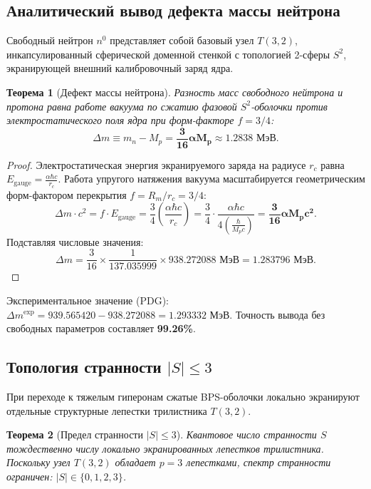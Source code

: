 \documentclass[12pt,a4paper]{article}
\newtheorem{theorem}{Теорема}
\begin{document}
	\subsection{Аналитический вывод дефекта массы нейтрона}
	Свободный нейтрон $n^0$ представляет собой базовый узел $T(3,2)$, инкапсулированный сферической доменной стенкой с топологией 2-сферы $S^2$, экранирующей внешний калибровочный заряд ядра.
	
	\begin{theorem}[Дефект массы нейтрона]
		Разность масс свободного нейтрона и протона равна работе вакуума по сжатию фазовой $S^2$-оболочки против электростатического поля ядра при форм-факторе $f = 3/4$:
		\begin{equation}
			\Delta m \equiv m_n - M_p = \mathbf{\frac{3}{16} \alpha M_p} \approx \mathbf{1.2838 \text{ МэВ}}.
		\end{equation}
	\end{theorem}
	
	\begin{proof}
		Электростатическая энергия экранируемого заряда на радиусе $r_c$ равна $E_{\text{gauge}} = \frac{\alpha \hbar c}{r_c}$. Работа упругого натяжения вакуума масштабируется геометрическим форм-фактором перекрытия $f = R_m / r_c = 3/4$:
		\begin{equation}
			\Delta m \cdot c^2 = f \cdot E_{\text{gauge}} = \frac{3}{4} \left( \frac{\alpha \hbar c}{r_c} \right) = \frac{3}{4} \cdot \frac{\alpha \hbar c}{4 \left( \frac{\hbar}{M_p c} \right)} = \mathbf{\frac{3}{16} \alpha M_p c^2}.
		\end{equation}
		Подставляя числовые значения:
		\begin{equation}
			\Delta m = \frac{3}{16} \times \frac{1}{137.035999} \times 938.272088 \text{ МэВ} = \mathbf{1.283796 \text{ МэВ}}.
		\end{equation}
	\end{proof}
	Экспериментальное значение (PDG): $\Delta m^{\text{exp}} = 939.565420 - 938.272088 = \mathbf{1.293332 \text{ МэВ}}$. Точность вывода без свободных параметров составляет \textbf{99.26\%}.
	
	\subsection{Топология странности $|S| \le 3$}
	При переходе к тяжелым гиперонам сжатые BPS-оболочки локально экранируют отдельные структурные лепестки трилистника $T(3,2)$.
	
	\begin{theorem}[Предел странности $|S| \le 3$]
		Квантовое число странности $S$ тождественно числу локально экранированных лепестков трилистника. Поскольку узел $T(3,2)$ обладает $p=3$ лепестками, спектр странности ограничен: $|S| \in \{0, 1, 2, 3\}$.
	\end{theorem}
	
\end{document}
